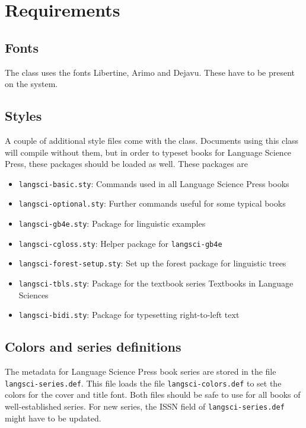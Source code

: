 \documentclass[%
output=guidelines,
guidelines]{langscibook}
\begin{document}
\chapter{Requirements}
\section{Fonts}
The class uses the fonts Libertine, Arimo and Dejavu. These have to be present on the system. 

\section{Styles}
A couple of additional style files come with the class. Documents using this class will compile without them, but in order to typeset books for Language Science Press, these packages should be loaded as well. These packages are

\begin{itemize}
 \item \texttt{langsci-basic.sty}: Commands used in all Language Science Press books
 \item \texttt{langsci-optional.sty}: Further commands useful for some typical books
 \item \texttt{langsci-gb4e.sty}: Package for linguistic examples
 \item \texttt{langsci-cgloss.sty}: Helper package for \texttt{langsci-gb4e}
 \item \texttt{langsci-forest-setup.sty}: Set up the forest package for linguistic trees
 \item \texttt{langsci-tbls.sty}: Package for the textbook series Textbooks in Language Sciences
 \item \texttt{langsci-bidi.sty}: Package for typesetting right-to-left text

\end{itemize}

\section{Colors and series definitions}
The metadata for Language Science Press book series are stored in the file \texttt{langsci-series.def}. This file loads the file \texttt{langsci-colors.def} to set the colors for the cover and title font. Both files should be safe to use for all books of well-established series. For new series, the ISSN field of \texttt{langsci-series.def} might have to be updated. 
\end{document}
